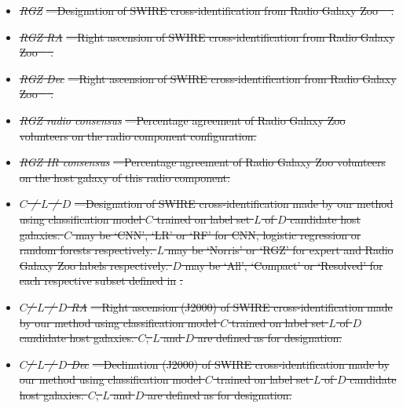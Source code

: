 \documentclass[11pt, a4paper]{book}
\providecommand{\DIFdeltex}[1]{{\protect\color{red}\sout{#1}}}                      %
\providecommand{\DIFdel}[1]{\texorpdfstring{\DIFdeltex{#1}}{}} %
\begin{document}
\begin{itemize}
{for CDFS and ELAIS-S1 respectively.
    }%
\item%
\emph{\DIFdel{RGZ}}%
\DIFdel{---Designation of SWIRE cross-identification from Radio Galaxy Zoo \mbox{%
\citep{wong21rgz}}\hspace{0pt}%
.
    }%
\item%
\emph{\DIFdel{RGZ RA}}%
\DIFdel{---Right ascension of SWIRE cross-identification from Radio Galaxy Zoo \mbox{%
\citep{wong21rgz}}\hspace{0pt}%
.
    }%
\item%
\emph{\DIFdel{RGZ Dec}}%
\DIFdel{---Right ascension of SWIRE cross-identification from Radio Galaxy Zoo \mbox{%
\citep{wong21rgz}}\hspace{0pt}%
.
    }%
\item%
\emph{\DIFdel{RGZ radio consensus}}%
\DIFdel{---Percentage agreement of Radio Galaxy Zoo volunteers on the radio component configuration.
    }%
\item%
\emph{\DIFdel{RGZ IR consensus}}%
\DIFdel{---Percentage agreement of Radio Galaxy Zoo volunteers on the host galaxy of this radio component.
    }%
\item%
\emph{\DIFdel{$C$ / $L$ / $D$}}%
\DIFdel{---Designation of SWIRE cross-identification made by our method using classification model $C$ trained on label set $L$ of $D$ candidate host galaxies. $C$ may be `CNN', `LR' or `RF' for CNN, logistic regression or random forests respectively. $L$ may be `Norris' or `RGZ' for expert and Radio Galaxy Zoo labels respectively. $D$ may be `All', `Compact' or `Resolved' for each respective subset defined in }%
\DIFdel{.
    }%
\item%
\emph{\DIFdel{$C$/ $L$ / $D$ RA}}%
\DIFdel{---Right ascension (J2000) of SWIRE cross-identification made by our method using classification model $C$ trained on label set $L$ of $D$ candidate host galaxies. $C$, $L$ and $D$ are defined as for designation.
    }%
\item%
\emph{\DIFdel{$C$/ $L$ / $D$ Dec}}%
\DIFdel{---Declination (J2000) of SWIRE cross-identification made by our method using classification model $C$ trained on label set $L$ of $D$ candidate host galaxies. $C$, $L$ and $D$ are defined as for designation.
  }
\end{itemize}%
\end{document}
